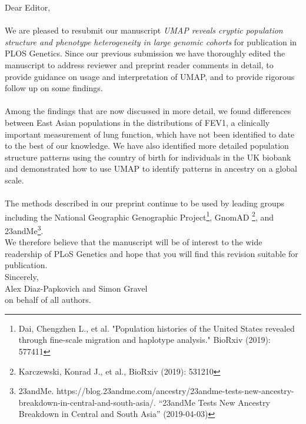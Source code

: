 \documentclass{article}
\begin{document}
Dear Editor,
\\\\
We are pleased to resubmit our manuscript \emph{UMAP reveals cryptic population structure and phenotype heterogeneity in large genomic cohorts} for publication in PLOS Genetics. Since our previous submission we have thoroughly edited the manuscript to address reviewer and preprint reader comments in detail, to provide guidance on usage and interpretation of UMAP, and to provide rigorous follow up on some findings.
\\\\
Among the findings that are now discussed in more detail, we found differences between East Asian populations in the distributions of FEV1, a clinically important measurement of lung function, which have not been identified to date to the best of our knowledge. We have also identified more detailed population structure patterns using the country of birth for individuals in the UK biobank and demonstrated how to use UMAP to identify patterns in ancestry on a global scale.
\\\\
The methods described in our preprint continue to be used by leading groups including the National Geographic Genographic Project\footnote{Dai, Chengzhen L., et al. "Population histories of the United States revealed through fine-scale migration and haplotype analysis." BioRxiv (2019): 577411}, GnomAD \footnote{Karczewski, Konrad J., et al., BioRxiv (2019): 531210 }, and 23andMe\footnote{23andMe. https://blog.23andme.com/ancestry/23andme-tests-new-ancestry-breakdown-in-central-and-south-asia/. ``23andMe Tests New Ancestry Breakdown in Central and South Asia'' (2019-04-03)}. 
\\
We therefore believe that the manuscript will be of interest to the wide readership of PLoS Genetics and hope that you will find this revision suitable for publication.
\\
Sincerely,
\\
Alex Diaz-Papkovich and Simon Gravel
\\
on behalf of all authors.
\end{document}
